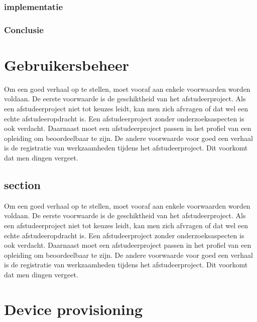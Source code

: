 		 
		
		\subsection{implementatie}
		
	 
		
		
		
		
		\subsection{Conclusie}
		
		\chapter{Gebruikersbeheer}
		
		Om een goed verhaal op te stellen, moet vooraf aan enkele voorwaarden
		worden voldaan. De eerste voorwaarde is de geschiktheid van het
		afstudeerproject. Als een afstudeerproject niet tot keuzes leidt, kan
		men zich afvragen of dat wel een echte afstudeeropdracht is. Een
		afstudeerproject zonder onderzoeksaspecten is ook verdacht. Daarnaast
		moet een afstudeerproject passen in het profiel van een opleiding om
		beoordeelbaar te zijn. De andere voorwaarde voor goed een verhaal is
		de registratie van werkzaamheden tijdens het afstudeerproject. Dit
		voorkomt dat men dingen vergeet.
		\section{section}
		
		Om een goed verhaal op te stellen, moet vooraf aan enkele voorwaarden
		worden voldaan. De eerste voorwaarde is de geschiktheid van het
		afstudeerproject. Als een afstudeerproject niet tot keuzes leidt, kan
		men zich afvragen of dat wel een echte afstudeeropdracht is. Een
		afstudeerproject zonder onderzoeksaspecten is ook verdacht. Daarnaast
		moet een afstudeerproject passen in het profiel van een opleiding om
		beoordeelbaar te zijn. De andere voorwaarde voor goed een verhaal is
		de registratie van werkzaamheden tijdens het afstudeerproject. Dit
		voorkomt dat men dingen vergeet.
		
		
		\chapter{Device provisioning}
		
